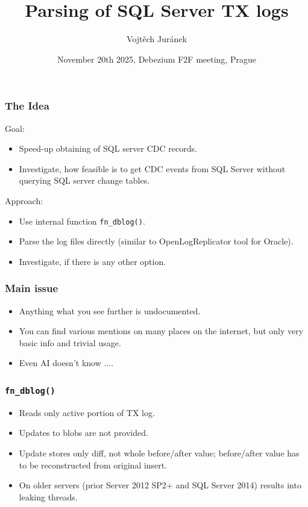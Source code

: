 \documentclass[10pt,utf8]{beamer}
\title{Parsing of SQL Server TX logs}
\author{Vojtěch Juránek}
\institute[Red Hat]{Red Hat}
\date{November 20th 2025, Debezium F2F meeting, Prague}
\begin{document}
\begin{frame}
    \titlepage
\end{frame}

\begin{frame}
    \frametitle{The Idea}
    Goal:
    \begin{itemize}
        \item Speed-up obtaining of SQL server CDC records.
        \item Investigate, how feasible is to get CDC events from SQL Server without querying SQL server change tables.
    \end{itemize}
    
    \vspace{1cm}
    
    Approach:
    \begin{itemize}
        \item Use internal function \texttt{fn\_dblog()}.
        \item Parse the log files directly (similar to OpenLogReplicator tool for Oracle).
        \item Investigate, if there is any other option.
    \end{itemize}
    
    \vspace{1cm}
\end{frame}

\begin{frame}
    \frametitle{Main issue}
    \begin{itemize}
        \item Anything what you see further is undocumented.
        \item You can find various mentions on many places on the internet, but only very basic info and trivial usage.
        \item Even AI doesn't know ....
    \end{itemize}
\end{frame}

\begin{frame}
    \frametitle{\texttt{fn\_dblog()}}
    \begin{itemize}
        \item Reads only active portion of TX log.
        \item Updates to blobs are not provided.
        \item Update stores only diff, not whole before/after value; before/after value has to be reconstructed from original insert.
        \item On older servers (prior Server 2012 SP2+ and SQL Server 2014) results into leaking threads.
    \end{itemize}
\end{frame}
\end{document}
